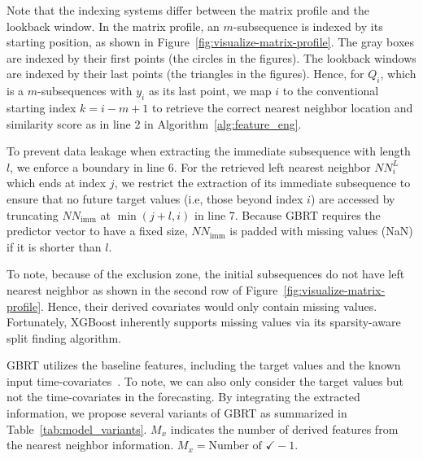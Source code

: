 Note that the indexing systems differ between the matrix profile and the lookback window. 
In the matrix profile, an $m$-subsequence is indexed by its starting position, as shown in Figure~\ref{fig:visualize-matrix-profile}. The gray boxes are indexed by their first points (the circles in the figures).
The lookback windows are indexed by their last points (the triangles in the figures).
Hence, for $Q_i$, which is a $m$-subsequences with $y_i$ as its last point, we map $i$ to the conventional starting index $k = i - m + 1$ to retrieve the correct nearest neighbor location and similarity score as in line 2 in Algorithm~\ref{alg:feature_eng}.

To prevent data leakage when extracting the immediate subsequence with length $l$, we enforce a boundary in line 6.
For the retrieved left nearest neighbor $NN^L_i$ which ends at index $j$, we restrict the extraction of its immediate subsequence to ensure that no future target values (i.e, those beyond index $i$) are accessed by truncating $NN_{\text{imm}}$ at $\min(j+l, i)$ in line 7.
Because GBRT requires the predictor vector to have a fixed size, $NN_{\text{imm}}$ is padded with missing values (NaN) if it is shorter than $l$.

To note, because of the exclusion zone, the initial subsequences do not have left nearest neighbor as shown in the second row of Figure~\ref{fig:visualize-matrix-profile}.
Hence, their derived covariates would only contain missing values.
%
Fortunately, XGBoost inherently supports missing values via its sparsity-aware split finding algorithm.


\textsf{GBRT} utilizes the baseline features, including the target values and the known input time-covariates~\cite{elsayed2021we}.
To note, we can also only consider the target values but not the time-covariates in the forecasting.
By integrating the extracted information, we propose several variants of \textsf{GBRT} as summarized in Table~\ref{tab:model_variants}.
$M_x$ indicates the number of derived features from the nearest neighbor information.
$M_x = \text{Number of } \checkmark - 1$.

